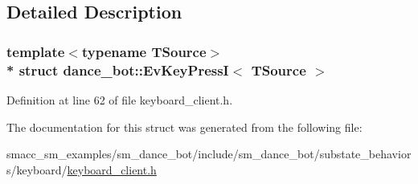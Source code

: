 \subsection{Detailed Description}
\subsubsection*{template$<$typename T\+Source$>$\\*
struct dance\+\_\+bot\+::\+Ev\+Key\+Press\+I$<$ T\+Source $>$}



Definition at line 62 of file keyboard\+\_\+client.\+h.



The documentation for this struct was generated from the following file\+:\begin{DoxyCompactItemize}
\item 
smacc\+\_\+sm\+\_\+examples/sm\+\_\+dance\+\_\+bot/include/sm\+\_\+dance\+\_\+bot/substate\+\_\+behaviors/keyboard/\hyperlink{keyboard__client_8h}{keyboard\+\_\+client.\+h}\end{DoxyCompactItemize}
